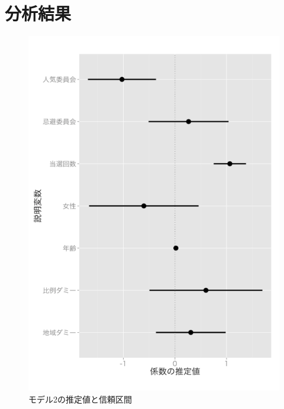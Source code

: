 \documentclass[12pt, a4j]{jsarticle}
\begin{document}
\newpage

\section{分析結果}

\begin{figure}[htbp]
	\centering
	\begin{minipage}{0.4\columnwidth}
		\centering
		\includegraphics[width=\columnwidth]{0_figs/model1_ctplr.pdf}
		\caption{モデル2の推定値と信頼区間} \label{fig:model1_ctplr}
	\end{minipage}
	\begin{minipage}{0.4\columnwidth}
		\centering

\end{minipage}
\end{figure}
\end{document}
